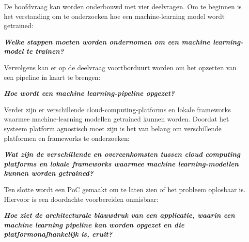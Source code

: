 De hoofdvraag kan worden onderbouwd met vier deelvragen. Om te beginnen is het verstanding om te onderzoeken hoe een \gls{machine-learning} model wordt getrained:\smallskip

\begin{center}
  \textbf{
    \textit{
      Welke stappen moeten worden ondernomen om een machine learning-model te trainen?
    }
  }
\end{center}\smallskip

Vervolgens kan er op de deelvraag voortborduurt worden om het opzetten van een pipeline in kaart te brengen:\smallskip

\begin{center}
  \textbf{
    \textit{
      Hoe wordt een machine learning-pipeline opgezet?
    }
  }
\end{center}\smallskip

Verder zijn er verschillende \glspl{cloud-computing-platform} en lokale frameworks waarmee \gls{machine-learning} modellen getrained kunnen worden. Doordat het systeem platform agnostisch moet zijn is het van belang om verschillende platformen en frameworks te onderzoeken:

\begin{center}
  \textbf{
    \textit{
      Wat zijn de verschillende en overeenkomsten tussen cloud computing platforms en lokale frameworks waarmee machine learning-modellen kunnen worden getrained?
    }
  }
\end{center}\smallskip

Ten slotte wordt een PoC gemaakt om te laten zien of het probleem oplosbaar is. Hiervoor is een doordachte voorbereiden onmisbaar:\smallskip

\begin{center}
  \textbf{
    \textit{
      Hoe ziet de architecturale blauwdruk van een applicatie, waarin een machine learning pipeline kan worden opgezet en die platformonafhankelijk is, eruit?
    }
  }
\end{center}